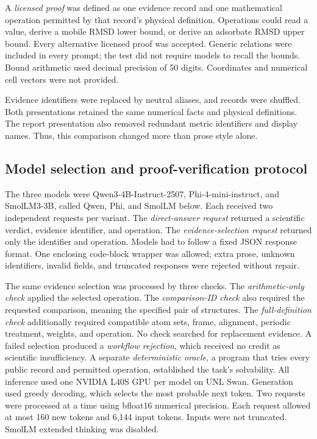 A \emph{licensed proof} was defined as one evidence record and one mathematical operation permitted by that record's physical definition. Operations could read a value, derive a mobile RMSD lower bound, or derive an adsorbate RMSD upper bound. Every alternative licensed proof was accepted. Generic relations were included in every prompt; the test did not require models to recall the bounds. Bound arithmetic used decimal precision of 50 digits. Coordinates and numerical cell vectors were not provided.

Evidence identifiers were replaced by neutral aliases, and records were shuffled. Both presentations retained the same numerical facts and physical definitions. The report presentation also removed redundant metric identifiers and display names. Thus, this comparison changed more than prose style alone.

\subsection{Model selection and proof-verification protocol}

The three models were Qwen3-4B-Instruct-2507, Phi-4-mini-instruct, and SmolLM3-3B, called Qwen, Phi, and SmolLM below. Each received two independent requests per variant. The \emph{direct-answer request} returned a scientific verdict, evidence identifier, and operation. The \emph{evidence-selection request} returned only the identifier and operation. Models had to follow a fixed JSON response format. One enclosing code-block wrapper was allowed; extra prose, unknown identifiers, invalid fields, and truncated responses were rejected without repair.

The same evidence selection was processed by three checks. The \emph{arithmetic-only check} applied the selected operation. The \emph{comparison-ID check} also required the requested comparison, meaning the specified pair of structures. The \emph{full-definition check} additionally required compatible atom sets, frame, alignment, periodic treatment, weights, and operation. No check searched for replacement evidence. A failed selection produced a \emph{workflow rejection}, which received no credit as scientific insufficiency. A separate \emph{deterministic oracle}, a program that tries every public record and permitted operation, established the task's solvability. All inference used one NVIDIA L40S GPU per model on UNL Swan. Generation used greedy decoding, which selects the most probable next token. Two requests were processed at a time using bfloat16 numerical precision. Each request allowed at most 160 new tokens and 6,144 input tokens. Inputs were not truncated. SmolLM extended thinking was disabled.

